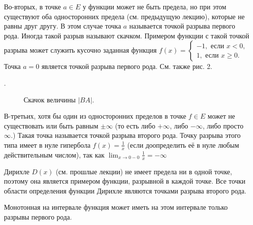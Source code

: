 Во-вторых, в точке $a \in E$ у функции может не быть предела, но при этом существуют оба односторонних предела (см. предыдущую лекцию), которые не равны друг другу. В этом случае точка $a$ называется точкой разрыва первого рода. Иногда такой разрыв называют скачком. Примером функции с такой точкой разрыва может служить кусочно заданная функция $f(x)=\left\{\begin{array}{l}-1, \text { если } x<0, \\ 1, \text { если } x \geq 0 .\end{array}\right.$ Точка $a=0$ является точкой разрыва первого рода. См. также рис. 2.

. \begin{figure}[h!]
    \caption{Скачок величины $|BA|$.}
    \label{fig:image}
\end{figure}

В-третьих, хотя бы один из односторонних пределов в точке $f \in E$ может не существовать или быть равным $\pm \infty$ (то есть либо $+\infty$, либо $-\infty$, либо просто $\infty$.) Такая точка называется точкой разрыва второго рода. Точку разрыва этого типа имеет в нуле гипербола $f(x)=\frac{1}{x}$ (если доопределить её в нуле любым действительным числом), так как $\lim _{x \rightarrow 0-0} \frac{1}{x}=-\infty$

Дирихле $D(x)$ (см. прошлые лекции) не имеет предела ни в одной точке, поэтому она является примером функции, разрывной в каждой точке. Все точки области определения функции Дирихле являются точками разрыва второго рода.

\begin{proposition}
    Монотонная на интервале функция может иметь на этом интервале только разрывы первого рода.
\end{proposition}

